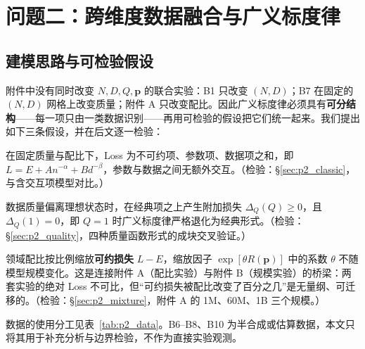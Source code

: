 \section{问题二：跨维度数据融合与广义标度律}
\label{sec:problem2}

\subsection{建模思路与可检验假设}

附件中没有同时改变 $N,D,Q,\boldsymbol p$ 的联合实验：B1 只改变 $(N,D)$；B7 在固定的 $(N,D)$ 网格上改变质量；附件 A 只改变配比。因此广义标度律必须具有\textbf{可分结构}——每一项只由一类数据识别——再用可检验的假设把它们统一起来。我们提出如下三条假设，并在后文逐一检验：

\begin{assumption}[参数—数据可分]\label{hyp:sep}
在固定质量与配比下，Loss 为不可约项、参数项、数据项之和，即 $L=E+An^{-\alpha}+Bd^{-\beta}$，参数与数据之间无额外交互。（检验：\S\ref{sec:p2_classic}，与含交互项模型对比。）
\end{assumption}

\begin{assumption}[质量加性惩罚且可退化]\label{hyp:quality}
数据质量偏离理想状态时，在经典项之上产生附加损失 $\Delta_Q(Q)\ge0$，且 $\Delta_Q(1)=0$，即 $Q=1$ 时广义标度律严格退化为经典形式。（检验：\S\ref{sec:p2_quality}，四种质量函数形式的成块交叉验证。）
\end{assumption}

\begin{assumption}[配比效应尺度不变]\label{hyp:mix}
领域配比按比例缩放\textbf{可约损失} $L-E$，缩放因子 $\exp[\theta R(\boldsymbol p)]$ 中的系数 $\theta$ 不随模型规模变化。这是连接附件 A（配比实验）与附件 B（规模实验）的桥梁：两套实验的绝对 Loss 不可比，但“可约损失被配比改变了百分之几”是无量纲、可迁移的。（检验：\S\ref{sec:p2_mixture}，附件 A 的 1M、60M、1B 三个规模。）
\end{assumption}

数据的使用分工见表~\ref{tab:p2_data}。B6--B8、B10 为半合成或估算数据，本文只将其用于补充分析与边界检验，不作为直接实验观测。

